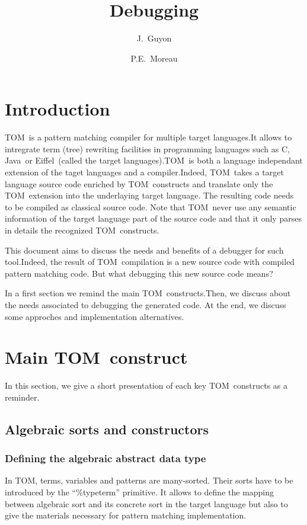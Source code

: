 \documentclass[a4paper]{article}
\author{J.~Guyon \and P.E.~Moreau}
\title{Debugging \TOM}
\newcommand{\TOM}{\textsf{TOM}}
\newcommand{\C}{\textsf{C}}
\newcommand{\Java}{\textsf{Java}}
\newcommand{\Eiffel}{\textsf{Eiffel}}
\begin{document}
\maketitle
\tableofcontents
\newpage

\section{Introduction}
\TOM\ is a pattern matching compiler for multiple target languages.It
allows to intregrate term (tree) rewriting facilities in programming
languages such as \C, \Java\ or \Eiffel\ (called the target
languages).\TOM\ is both a language independant extension of the taget
languages and a
compiler.Indeed, \TOM\ takes a target language source code enriched by \TOM\
constructs and translate only the \TOM\ extension into the underlaying
target language. The resulting code needs to be compiled as classical
source code. Note that \TOM\ never use any semantic information of
the target language part of the source code and that it only parses in
details the recognized \TOM\ constructs.

This document aims to discuss the needs and benefits of a debugger for
such tool.Indeed, the result of \TOM\ compilation is a new source code
with compiled pattern matching code. But what debugging this new source code means?

In a first section we remind the main \TOM\ constructs.Then, we
discuss about the needs associated to debugging the generated code. At
the end, we discuss some approches and implementation alternatives.

\section{Main \TOM\ construct}
In this section, we give a short presentation of each key \TOM\
constructs as a reminder.

\subsection{Algebraic sorts and constructors}
\subsubsection{Defining the algebraic abstract data type}
In \TOM, terms, variables and patterns are many-sorted. Their sorts
have to be introduced by the ``\%typeterm'' primitive. It allows to
define the mapping between algebraic sort and its concrete sort in the
target language but
also to give the materials necessary for pattern matching implementation.
\end{document}
